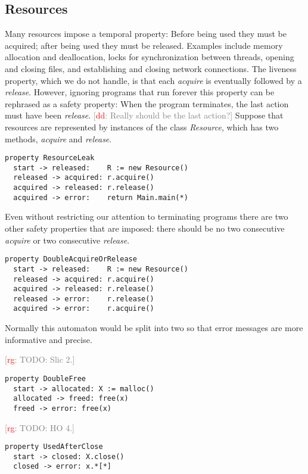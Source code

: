 \documentclass[preprint]{sigplanconf} %
\newcommand{\note}[2]{\textcolor{gray}{[\textcolor{red}{#1}: #2]}}
\newcommand{\rg}[1]{\note{rg}{#1}}
\newcommand{\dd}[1]{\note{dd}{#1}}
\newcommand{\dinocomment}[1]{\dd{#1}}
\theoremstyle{definition}
\theoremstyle{remark}
\begin{document}
\subsection{Resources} %

Many resources impose a temporal property:
Before being used they must be acquired;
after being used they must be released.
Examples include memory allocation and deallocation, locks for synchronization between threads, opening and closing files, and establishing and closing network connections.
The liveness property, which we do not handle, is that each \textit{acquire} is eventually followed by a \textit{release}.
However, ignoring programs that run forever this property can be rephrased as a safety property:
When the program terminates, the last action must have been \textit{release}.
\dinocomment{Really should be the last action?}
Suppose that resources are represented by instances of the class \textit{Resource}, which has two methods, \textit{acquire} and \textit{release}.
\par\medskip\noindent
\begin{Verbatim}
property ResourceLeak
  start -> released:    R := new Resource()
  released -> acquired: r.acquire()
  acquired -> released: r.release()
  acquired -> error:    return Main.main(*)
\end{Verbatim}
\par\medskip\noindent
Even without restricting our attention to terminating programs there are two other safety properties that are imposed:
there should be no two consecutive \textit{acquire} or two consecutive \textit{release}.
\par\medskip\noindent
\begin{Verbatim}
property DoubleAcquireOrRelease
  start -> released:    R := new Resource()
  released -> acquired: r.acquire()
  acquired -> released: r.release()
  released -> error:    r.release()
  acquired -> error:    r.acquire()
\end{Verbatim}
\par\medskip\noindent
Normally this automaton would be split into two so that error messages are more informative and precise.

\rg{TODO: Slic 2.}
\par\medskip\noindent
\begin{Verbatim}
property DoubleFree
  start -> allocated: X := malloc()
  allocated -> freed: free(x)
  freed -> error: free(x)
\end{Verbatim}

\rg{TODO: HO 4.}
\par\medskip\noindent
\begin{Verbatim}
property UsedAfterClose
  start -> closed: X.close()
  closed -> error: x.*[*]
\end{Verbatim}
\end{document}
